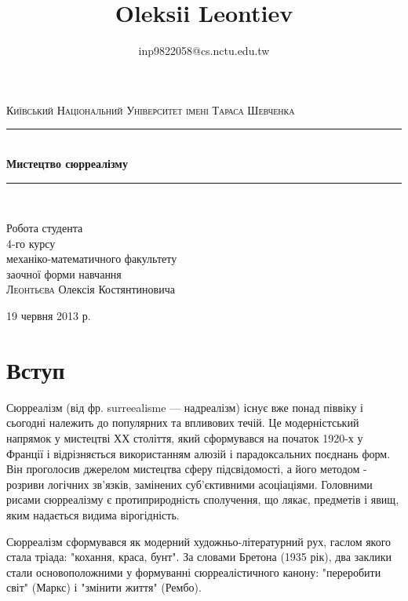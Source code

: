\documentclass[14pt]{extarticle} %
\title{\bfseries\Huge Oleksii Leontiev}
\author{inp9822058@cs.nctu.edu.tw}
\date{}
\begin{document}
\begin{titlepage}
	\addtolength{\voffset}{-2cm}
	\thispagestyle{fancy}
	\begin{center}
		\newcommand{\HRule}{\rule{\linewidth}{0.5mm}}
		\textsc{\Large Київський Національний Університет імені Тараса Шевченка}\\[1.5cm]

		\HRule \\[0.4cm]
		{ \huge \bfseries Мистецтво сюрреалізму}\\[0.4cm]

		\HRule \\[1.5cm]

			\begin{flushright} \large
				Робота студента\\
				4-го курсу\\
				механіко-математичного факультету\\
				заочної форми навчання\\
				\textsc{Леонтьєва} Олексія Костянтиновича
			\end{flushright}

		\vfill

		{\large 19 червня 2013 р.}
	\end{center}
\end{titlepage}
\section{Вступ}
Сюрреалізм (від фр. surreealisme — надреалізм) існує вже понад піввіку і сьогодні належить до популярних та впливових течій. 
Це модерністський напрямок у мистецтві ХХ століття,
який сформувався на початок 1920-х у Франції і відрізняється використанням алюзій і парадоксальних поєднань форм. Він проголосив джерелом мистецтва
сферу підсвідомості, а його методом - розриви
логічних зв'язків, замінених суб'єктивними асоціаціями. Головними рисами сюрреалізму є протиприродність сполучення, що лякає, предметів 
і явищ, яким надається видима вірогідність.

Сюрреалізм сформувався як модерний художньо-літературний рух, гаслом якого стала тріада: "кохання, краса, бунт". За словами Бретона (1935 рік), два заклики стали основоположними у формуванні сюрреалістичного канону: "переробити світ" (Маркс) і "змінити життя" (Рембо).
\end{document}

